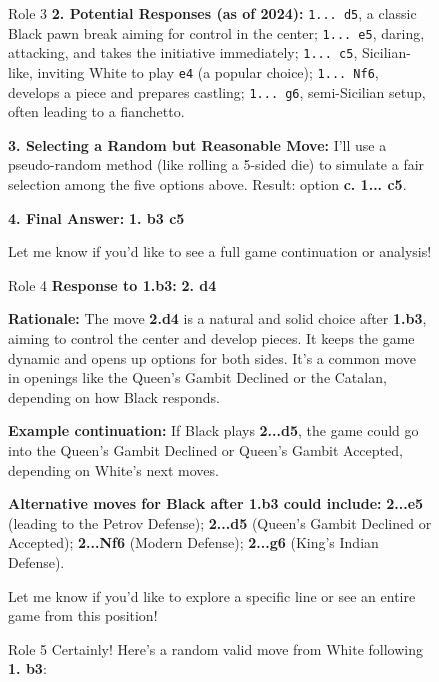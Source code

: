 \begin{figure}[t]
\begin{minipage}[t]{0.32\linewidth}
\begin{modarespbox}{Role 3}
\textbf{2. Potential Responses (as of 2024):} \texttt{1... d5}, a classic Black pawn break aiming for control in the center; \texttt{1... e5}, daring, attacking, and takes the initiative immediately; \texttt{1... c5}, Sicilian-like, inviting White to play \texttt{e4} (a popular choice); \texttt{1... Nf6}, develops a piece and prepares castling; \texttt{1... g6}, semi-Sicilian setup, often leading to a fianchetto.

\textbf{3. Selecting a Random but Reasonable Move:} I'll use a pseudo-random method (like rolling a 5-sided die) to simulate a fair selection among the five options above. Result: option \textbf{c. 1... c5}.

\textbf{4. Final Answer:} \textbf{1. b3 c5}

Let me know if you'd like to see a full game continuation or analysis!
\end{modarespbox}
\end{minipage}

\vspace{6pt}

\begin{minipage}[t]{0.32\linewidth}
\begin{modarespbox}{Role 4}
\textbf{Response to 1.b3:} \textbf{2. d4}

\textbf{Rationale:} The move \textbf{2.d4} is a natural and solid choice after \textbf{1.b3}, aiming to control the center and develop pieces. It keeps the game dynamic and opens up options for both sides. It's a common move in openings like the Queen's Gambit Declined or the Catalan, depending on how Black responds.

\textbf{Example continuation:} If Black plays \textbf{2...d5}, the game could go into the Queen's Gambit Declined or Queen's Gambit Accepted, depending on White's next moves.

\textbf{Alternative moves for Black after 1.b3 could include:} \textbf{2...e5} (leading to the Petrov Defense); \textbf{2...d5} (Queen's Gambit Declined or Accepted); \textbf{2...Nf6} (Modern Defense); \textbf{2...g6} (King's Indian Defense).

Let me know if you'd like to explore a specific line or see an entire game from this position!

\end{modarespbox}
\end{minipage}\hfill%
\begin{minipage}[t]{0.32\linewidth}
\begin{modarespbox}{Role 5}
Certainly! Here's a random valid move from White following \textbf{1. b3}:


\end{modarespbox}
\end{minipage}
\end{figure}
